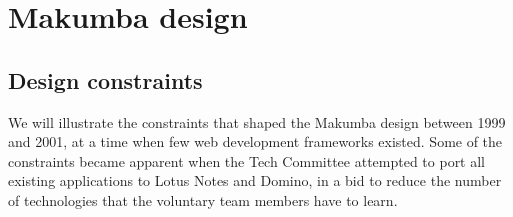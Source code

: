 \documentclass{llncs}
\begin{document}




\section{Makumba design}\label{sec:makumba}

\subsection{Design constraints}
We will illustrate the constraints that shaped the Makumba design between 1999 and 2001, at a time when few web development frameworks existed. Some of the constraints became apparent when the Tech Committee attempted to port all existing applications to Lotus Notes and Domino, in a bid to reduce the number of technologies that the voluntary team members have to learn.
\end{document}
